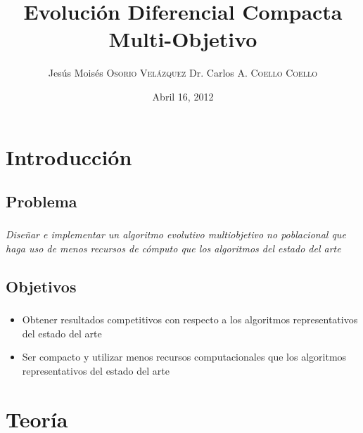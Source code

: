 \documentclass[serif]{beamer}
\title[mocDE]{Evolución Diferencial Compacta Multi-Objetivo}
\author[Moisés \textsc{Osorio}]{Jesús Moisés \textsc{Osorio Velázquez} \linebreak Dr. Carlos A. \textsc{Coello Coello} }
\date{Abril 16, 2012}
\institute[\textsc{CINVESTAV-IPN}]{\textsc{Centro de Investigación y de Estudios Avanzados del IPN}}
\begin{document}
\frame{
  \titlepage
}

\frame[allowframebreaks]{
	\setcounter{tocdepth}{2}
	\tableofcontents
}

\section{Introducción}

\subsection{Problema}
\begin{frame}
\frametitle{\insertsubsection}
	\begin{center}
	\emph{Diseñar e implementar un algoritmo evolutivo multiobjetivo no poblacional que haga uso de menos recursos de cómputo que los algoritmos del estado del arte}
	\end{center}
\end{frame}

\subsection{Objetivos}
\begin{frame}
\frametitle{\insertsubsection}
	\begin{itemize}\setlength{\itemsep}{4mm}
		\item Obtener resultados competitivos con respecto a los algoritmos representativos del estado del arte
		\item Ser compacto y utilizar menos recursos computacionales que los algoritmos representativos del estado del arte
	\end{itemize}
\end{frame}


\section{Teoría}
\end{document}
